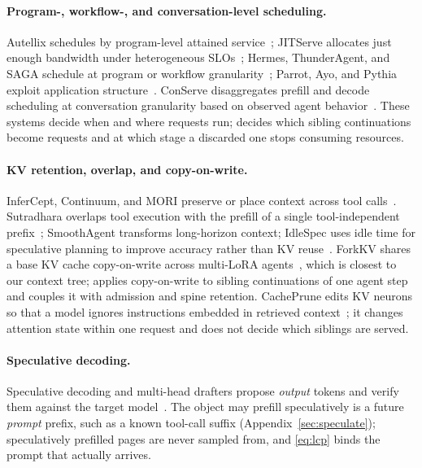 \paragraph{Program-, workflow-, and conversation-level scheduling.}
Autellix schedules by program-level attained service~\cite{autellix}; JITServe allocates just enough bandwidth under heterogeneous SLOs~\cite{jitserve}; Hermes, ThunderAgent, and SAGA schedule at program or workflow granularity~\cite{hermes,thunderagent,saga}; Parrot, Ayo, and Pythia exploit application structure~\cite{parrot,ayo,pythia}.
ConServe disaggregates prefill and decode scheduling at conversation granularity based on observed agent behavior~\cite{conserve}.
These systems decide when and where requests run; \sys decides which sibling continuations become requests and at which stage a discarded one stops consuming resources.

\paragraph{KV retention, overlap, and copy-on-write.}
InferCept, Continuum, and MORI preserve or place context across tool calls~\cite{infercept,continuum,mori}.
Sutradhara overlaps tool execution with the prefill of a single tool-independent prefix~\cite{sutradhara}; SmoothAgent transforms long-horizon context; IdleSpec uses idle time for speculative planning to improve accuracy rather than KV reuse~\cite{smoothagent,idlespec}.
ForkKV shares a base KV cache copy-on-write across multi-LoRA agents~\cite{forkkv}, which is closest to our context tree; \sys applies copy-on-write to sibling continuations of one agent step and couples it with admission and spine retention.
CachePrune edits KV neurons so that a model ignores instructions embedded in retrieved context~\cite{cacheprune}; it changes attention state within one request and does not decide which siblings are served.

\paragraph{Speculative decoding.}
Speculative decoding and multi-head drafters propose \emph{output} tokens and verify them against the target model~\cite{speculative,medusa,eagledraft}.
The object \sys may prefill speculatively is a future \emph{prompt} prefix, such as a known tool-call suffix (Appendix~\ref{sec:speculate}); speculatively prefilled pages are never sampled from, and \eqref{eq:lcp} binds the prompt that actually arrives.
